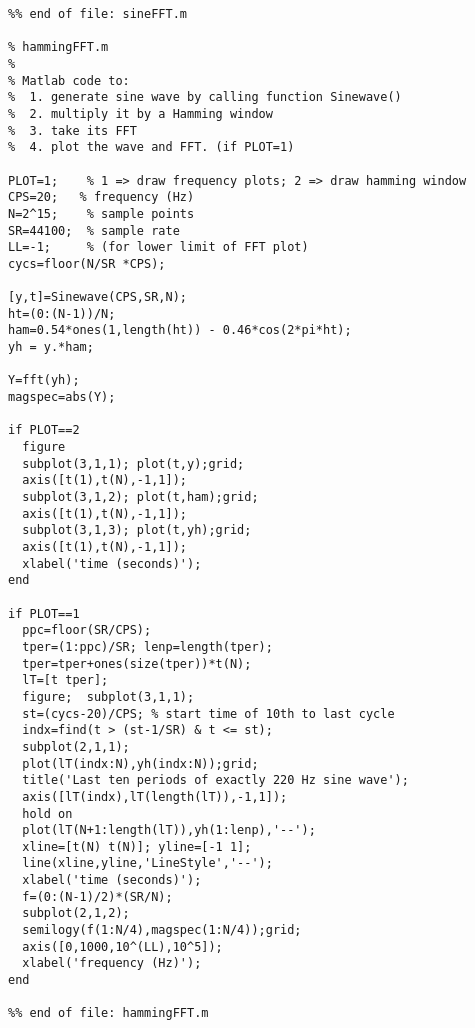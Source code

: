 \begin{verbatim}
%% end of file: sineFFT.m

% hammingFFT.m
%
% Matlab code to:
%  1. generate sine wave by calling function Sinewave() 
%  2. multiply it by a Hamming window
%  3. take its FFT 
%  4. plot the wave and FFT. (if PLOT=1)

PLOT=1;    % 1 => draw frequency plots; 2 => draw hamming window
CPS=20;   % frequency (Hz)
N=2^15;    % sample points
SR=44100;  % sample rate
LL=-1;     % (for lower limit of FFT plot)
cycs=floor(N/SR *CPS); 

[y,t]=Sinewave(CPS,SR,N);
ht=(0:(N-1))/N;
ham=0.54*ones(1,length(ht)) - 0.46*cos(2*pi*ht);
yh = y.*ham;

Y=fft(yh);
magspec=abs(Y);

if PLOT==2
  figure  
  subplot(3,1,1); plot(t,y);grid;
  axis([t(1),t(N),-1,1]);
  subplot(3,1,2); plot(t,ham);grid;  
  axis([t(1),t(N),-1,1]);
  subplot(3,1,3); plot(t,yh);grid;
  axis([t(1),t(N),-1,1]);
  xlabel('time (seconds)');
end

if PLOT==1
  ppc=floor(SR/CPS);
  tper=(1:ppc)/SR; lenp=length(tper);
  tper=tper+ones(size(tper))*t(N);
  lT=[t tper];
  figure;  subplot(3,1,1);
  st=(cycs-20)/CPS; % start time of 10th to last cycle
  indx=find(t > (st-1/SR) & t <= st);
  subplot(2,1,1);
  plot(lT(indx:N),yh(indx:N));grid;
  title('Last ten periods of exactly 220 Hz sine wave');
  axis([lT(indx),lT(length(lT)),-1,1]);
  hold on
  plot(lT(N+1:length(lT)),yh(1:lenp),'--');
  xline=[t(N) t(N)]; yline=[-1 1];
  line(xline,yline,'LineStyle','--');
  xlabel('time (seconds)');
  f=(0:(N-1)/2)*(SR/N);
  subplot(2,1,2);
  semilogy(f(1:N/4),magspec(1:N/4));grid;
  axis([0,1000,10^(LL),10^5]);
  xlabel('frequency (Hz)');
end

%% end of file: hammingFFT.m
\end{verbatim}

